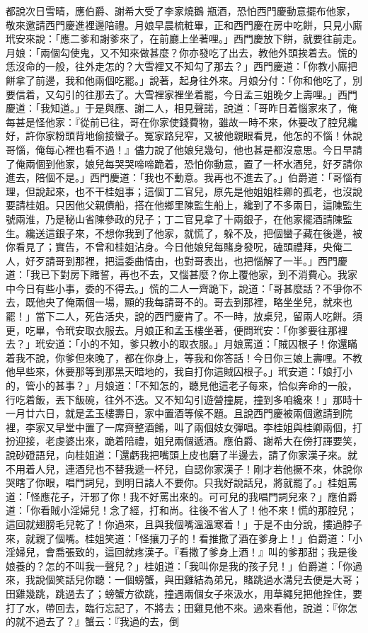 都說次日雪晴，應伯爵、謝希大受了李家燒鵝 瓶酒，恐怕西門慶動意擺布他家，敬來邀請西門慶進裡邊陪禮。月娘早晨梳粧畢，正和西門慶在房中吃餅，只見小廝玳安來說：「應二爹和謝爹來了，在前廳上坐著哩。」西門慶放下餅，就要往前走。月娘：「兩個勾使鬼，又不知來做甚麼？你亦發吃了出去，教他外頭挨着去。慌的恁沒命的一般，往外走怎的？大雪裡又不知勾了那去？」西門慶道：「你教小廝把餅拿了前邊，我和他兩個吃罷。」說著，起身往外來。月娘分付：「你和他吃了，別要信着，又勾引的往那去了。大雪裡家裡坐着罷，今日孟三姐晚夕上壽哩。」西門慶道：「我知道。」于是與應、謝二人，相見聲諾，說道：「哥昨日着惱家來了，俺每甚是怪他家：『從前已往，哥在你家使錢費物，雖故一時不來，休要改了腔兒纔好，許你家粉頭背地偷接蠻子。冤家路兒窄，又被他親眼看見，他怎的不惱！休說哥惱，俺每心裡也看不過！』儘力說了他娘兒幾句，他也甚是都沒意思。今日早請了俺兩個到他家，娘兒每哭哭啼啼跪着，恐怕你動意，置了一杯水酒兒，好歹請你進去，陪個不是。」西門慶道：「我也不動意。我再也不進去了。」伯爵道：「哥惱有理，但說起來，也不干桂姐事；這個丁二官兒，原先是他姐姐桂卿的孤老，也沒說要請桂姐。只因他父親債船，搭在他鄉里陳監生船上，纔到了不多兩日，這陳監生號兩淮，乃是秘山省陳參政的兒子；丁二官見拿了十兩銀子，在他家擺酒請陳監生。纔送這銀子來，不想你我到了他家，就慌了，躲不及，把個蠻子藏在後邊，被你看見了；實告，不曾和桂姐沾身。今日他娘兒每賭身發呪，磕頭禮拜，央俺二人，好歹請哥到那裡，把這委曲情由，也對哥表出，也把惱解了一半。」西門慶道：「我已下對房下賭誓，再也不去，又惱甚麼？你上覆他家，到不消費心。我家中今日有些小事，委的不得去。」慌的二人一齊跪下，說道：「哥甚麼話？不爭你不去，既他央了俺兩個一場，顯的我每請哥不的。哥去到那裡，略坐坐兒，就來也罷！」當下二人，死告活央，說的西門慶肯了。不一時，放桌兒，留兩人吃餅。須更，吃畢，令玳安取衣服去。月娘正和孟玉樓坐著，便問玳安：「你爹要往那裡去？」玳安道：「小的不知，爹只教小的取衣服。」月娘罵道：「賊囚根子！你還瞞着我不說，你爹但來晚了，都在你身上，等我和你答話！今日你三娘上壽哩。不教他早些來，休要那等到那黑天暗地的，我自打你這賊囚根子。」玳安道：「娘打小的，管小的甚事？」月娘道：「不知怎的，聽見他這老子每來，恰似奔命的一般，行吃着飯，丟下飯碗，往外不迭。又不知勾引遊營撞屍，撞到多咱纔來！」那時十一月廿六日，就是孟玉樓壽日，家中置酒等候不題。且說西門慶被兩個邀請到院裡，李家又早堂中置了一席齊整酒餚，叫了兩個妓女彈唱。李桂姐與桂卿兩個，打扮迎接，老虔婆出來，跪着陪禮，姐兒兩個遞酒。應伯爵、謝希大在傍打諢要笑，說砂磴語兒，向桂姐道：「還虧我把嘴頭上皮也磨了半邊去，請了你家漢子來。就不用着人兒，連酒兒也不替我遞一杯兒，自認你家漢子！剛才若他撅不來，休說你哭瞎了你眼，唱門詞兒，到明日諸人不要你。只我好說話兒，將就罷了。」桂姐罵道：「怪應花子，汗邪了你！我不好罵出來的。可可兒的我唱門詞兒來？」應伯爵道：「你看賊小淫婦兒！念了經，打和尚。往後不省人了！他不來！慌的那腔兒；這回就翅膀毛兒乾了！你過來，且與我個嘴溫溫寒着！」于是不由分說，摟過脖子來，就親了個嘴。桂姐笑道：「怪攘刀子的！看推撒了酒在爹身上！」伯爵道：「小淫婦兒，會喬張致的，這回就疼漢子。『看撒了爹身上酒！』叫的爹那甜；我是後娘養的？怎的不叫我一聲兒？」桂姐道：「我叫你是我的孩子兒！」伯爵道：「你過來，我說個笑話兒你聽：一個螃蟹，與田雞結為弟兄，賭跳過水溝兒去便是大哥；田雞幾跳，跳過去了；螃蟹方欲跳，撞遇兩個女子來汲水，用草繩兒把他拴住，要打了水，帶回去，臨行忘記了，不將去；田雞見他不來。過來看他，說道：『你怎的就不過去了？』蟹云：『我過的去，倒